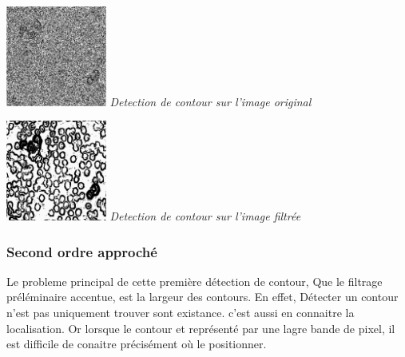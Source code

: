 \documentclass[a4,12pt]{article}
\begin{document}
\noindent
\begin{center}
\begin{minipage}[c]{0.20\linewidth}
	\begin{center}
		\includegraphics[width = 33mm]{./img/globulesbb26_mean.jpg}
		\textit{Detection de contour sur l'image original}
	\end{center}
\end{minipage}
\begin{minipage}[c]{0.20\linewidth}
	\begin{center}
		\includegraphics[width = 33mm]{./img/globulesbb26_filtrer3_mean.jpg}
		\textit{Detection de contour sur l'image filtrée}
	\end{center}
\end{minipage}
\end{center}



\subsubsection{Second ordre approché}
Le probleme principal de cette première détection de contour, Que le filtrage préléminaire accentue, est la largeur des contours.
En effet, Détecter un contour n'est pas uniquement trouver sont existance. c'est aussi en connaitre la localisation. Or lorsque le contour et représenté par une
lagre bande de pixel, il est difficile de conaitre précisément où le positionner.\\
\end{document}

